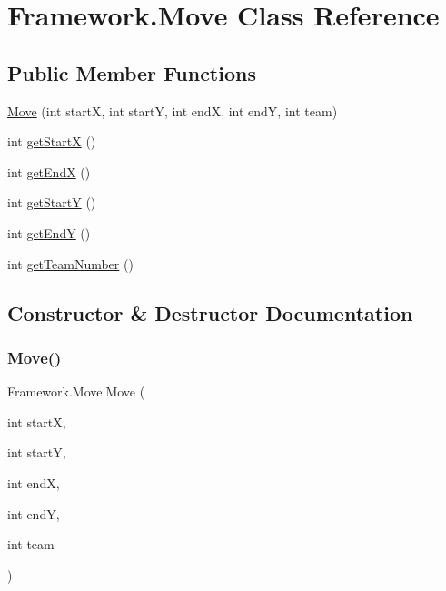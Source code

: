 \hypertarget{class_framework_1_1_move}{}\section{Framework.\+Move Class Reference}
\label{class_framework_1_1_move}
\subsection*{Public Member Functions}
\begin{DoxyCompactItemize}
\item 
\hyperlink{class_framework_1_1_move_a0eacf72c68a1498216d29f0ec79f94f8}{Move} (int startX, int startY, int endX, int endY, int team)
\item 
int \hyperlink{class_framework_1_1_move_a1a34fa63dccc131e644397d2a0a66b6c}{get\+StartX} ()
\item 
int \hyperlink{class_framework_1_1_move_a70f0595c059a11eff1e273417ecb2f33}{get\+EndX} ()
\item 
int \hyperlink{class_framework_1_1_move_ac1f0fed6c7606b78d2ff2707f2b768a9}{get\+StartY} ()
\item 
int \hyperlink{class_framework_1_1_move_a1659de45a06356489653a79807fa5abb}{get\+EndY} ()
\item 
int \hyperlink{class_framework_1_1_move_ab5f197f193dbc46f5e49caf1389a1eb3}{get\+Team\+Number} ()
\end{DoxyCompactItemize}


\subsection{Constructor \& Destructor Documentation}
\hypertarget{class_framework_1_1_move_a0eacf72c68a1498216d29f0ec79f94f8}{}\label{class_framework_1_1_move_a0eacf72c68a1498216d29f0ec79f94f8} 
\subsubsection{\texorpdfstring{Move()}{Move()}}
{\footnotesize\ttfamily Framework.\+Move.\+Move (\begin{DoxyParamCaption}\item[{int}]{startX,  }\item[{int}]{startY,  }\item[{int}]{endX,  }\item[{int}]{endY,  }\item[{int}]{team }\end{DoxyParamCaption})}

